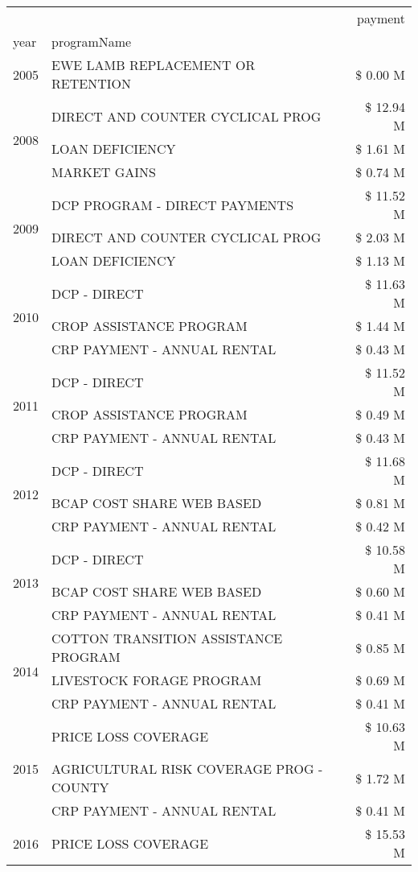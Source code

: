 \begin{tabular}{llr}
\toprule
 &  & payment \\
year & programName &  \\
\midrule
2005 & EWE LAMB REPLACEMENT OR RETENTION & \$ 0.00 M \\
\cline{1-3}
\multirow[t]{3}{*}{2008} & DIRECT AND COUNTER CYCLICAL PROG & \$ 12.94 M \\
 & LOAN DEFICIENCY & \$ 1.61 M \\
 & MARKET GAINS & \$ 0.74 M \\
\cline{1-3}
\multirow[t]{3}{*}{2009} & DCP PROGRAM - DIRECT PAYMENTS & \$ 11.52 M \\
 & DIRECT AND COUNTER CYCLICAL PROG & \$ 2.03 M \\
 & LOAN DEFICIENCY & \$ 1.13 M \\
\cline{1-3}
\multirow[t]{3}{*}{2010} & DCP - DIRECT & \$ 11.63 M \\
 & CROP ASSISTANCE PROGRAM & \$ 1.44 M \\
 & CRP PAYMENT - ANNUAL RENTAL & \$ 0.43 M \\
\cline{1-3}
\multirow[t]{3}{*}{2011} & DCP - DIRECT & \$ 11.52 M \\
 & CROP ASSISTANCE PROGRAM & \$ 0.49 M \\
 & CRP PAYMENT - ANNUAL RENTAL & \$ 0.43 M \\
\cline{1-3}
\multirow[t]{3}{*}{2012} & DCP - DIRECT & \$ 11.68 M \\
 & BCAP COST SHARE WEB BASED & \$ 0.81 M \\
 & CRP PAYMENT - ANNUAL RENTAL & \$ 0.42 M \\
\cline{1-3}
\multirow[t]{3}{*}{2013} & DCP - DIRECT & \$ 10.58 M \\
 & BCAP COST SHARE WEB BASED & \$ 0.60 M \\
 & CRP PAYMENT - ANNUAL RENTAL & \$ 0.41 M \\
\cline{1-3}
\multirow[t]{3}{*}{2014} & COTTON TRANSITION ASSISTANCE PROGRAM & \$ 0.85 M \\
 & LIVESTOCK FORAGE PROGRAM & \$ 0.69 M \\
 & CRP PAYMENT - ANNUAL RENTAL & \$ 0.41 M \\
\cline{1-3}
\multirow[t]{3}{*}{2015} & PRICE LOSS COVERAGE & \$ 10.63 M \\
 & AGRICULTURAL RISK COVERAGE PROG - COUNTY & \$ 1.72 M \\
 & CRP PAYMENT - ANNUAL RENTAL & \$ 0.41 M \\
\cline{1-3}
\multirow[t]{3}{*}{2016} & PRICE LOSS COVERAGE & \$ 15.53 M \\

\end{tabular}
